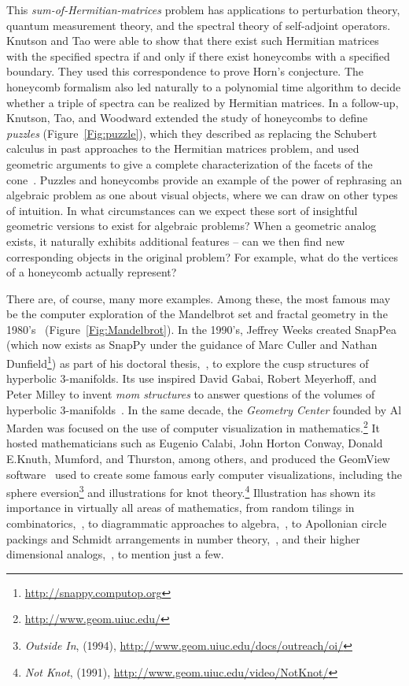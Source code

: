 \documentclass{notices}
\begin{document}
This \emph{sum-of-Hermitian-matrices} problem has applications to perturbation theory, quantum measurement theory, and the spectral theory of self-adjoint operators. Knutson and Tao were able to show that there exist such Hermitian matrices with the specified spectra if and only if there exist honeycombs with a specified boundary. They used this correspondence to prove Horn's conjecture.  The honeycomb formalism also led naturally to a polynomial time algorithm to decide whether a triple of spectra can be realized by Hermitian matrices.  In a follow-up, Knutson, Tao, and Woodward extended the study of honeycombs to define \emph{puzzles} (Figure~\ref{Fig:puzzle}), which they described as replacing the Schubert calculus in past approaches to the Hermitian matrices problem, and used geometric arguments to give a complete characterization of the facets of the cone~\cite{honeycomb2}.  Puzzles and honeycombs provide an example of the power of rephrasing an algebraic problem as one about visual objects, where we can draw on other types of intuition.  In what circumstances can we expect these sort of insightful geometric versions to exist for algebraic problems?  When a geometric analog exists, it naturally exhibits additional features -- can we then find new corresponding objects in the original problem?  For example, what do the vertices of a honeycomb actually represent?

There are, of course, many more examples.  Among these, the most famous may be the computer exploration of the Mandelbrot set and fractal geometry in the 1980's~\cite{mand82} (Figure~\ref{Fig:Mandelbrot}).  In the 1990's, Jeffrey Weeks created SnapPea (which now exists as SnapPy under the guidance of Marc Culler and Nathan Dunfield\footnote{\url{http://snappy.computop.org}}) as part of his doctoral thesis,~\cite{Weeks93}, to explore the cusp structures of hyperbolic 3-manifolds. Its use inspired David Gabai, Robert Meyerhoff, and Peter Milley to invent \emph{mom structures} to answer questions of the volumes of hyperbolic 3-manifolds~\cite{momTech}.  In the same decade, the \emph{Geometry Center} founded by Al Marden was focused on the use of computer visualization in mathematics.\footnote{\url{http://www.geom.uiuc.edu/}} It hosted mathematicians such as Eugenio Calabi, John Horton Conway, Donald E.\@ Knuth, Mumford, and Thurston, among others, and produced the GeomView software~\cite{GeomView}
used to create some famous early computer visualizations, including the sphere eversion\footnote{\textit{Outside In}, (1994), \url{http://www.geom.uiuc.edu/docs/outreach/oi/}} and illustrations for knot theory.\footnote{\textit{Not Knot}, (1991), \url{http://www.geom.uiuc.edu/video/NotKnot/}}
Illustration has shown its importance in virtually all areas of mathematics, from random tilings in combinatorics,~\cite{aztec}, 
to diagrammatic approaches to algebra,~\cite{TLDiagrams}, 
to Apollonian circle packings and Schmidt arrangements in number theory,~\cites{Mar19,Sta18,Fuchs13}, 
and their higher dimensional analogs,~\cite{spherePackings}, 
to mention just a few.
\end{document}
